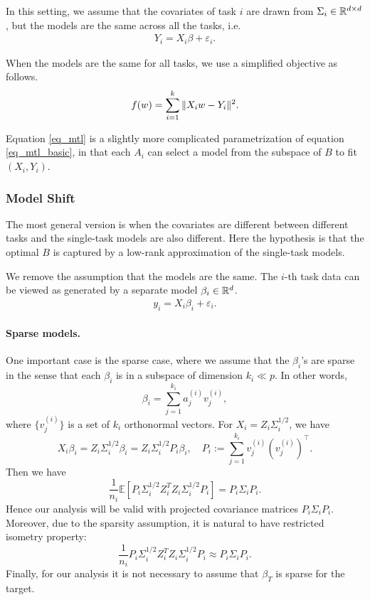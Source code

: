 In this setting, we assume that the covariates of task $i$ are drawn from $\Sigma_i \in \mathbb{R}^{d \times d}$, but the models are the same across all the tasks, i.e.
\begin{align}
	Y_i = X_i \beta + \varepsilon_i. %
\end{align}

When the models are the same for all tasks, we use a simplified objective as follows.
\begin{align}
	\label{eq_mtl_basic}
	f(w) = \sum_{i=1}^k \|X_i w - Y_i\|^2.
\end{align}

Equation \eqref{eq_mtl} is a slightly more complicated parametrization of equation \eqref{eq_mtl_basic}, in that each $A_i$ can select a model from the subspace of $B$ to fit $(X_i, Y_i)$.



\subsubsection{Model Shift}

The most general version is when the covariates are different between different tasks and the single-task models are also different.
Here the hypothesis is that the optimal $B$ is captured by a low-rank approximation of the single-task models.


We remove the assumption that the models are the same.
The $i$-th task data can be viewed as generated by a separate model $\beta_i\in\mathbb{R}^d$.
\begin{align}
	y_i = X_i \beta_i + \varepsilon_i.
\end{align}

\paragraph{Sparse models.}
One important case is the sparse case, where we assume that the $\beta_i$'s are sparse in the sense 
that each $\beta_i$ is in a subspace of dimension $k_i\ll p$. In other words,
$$\beta_i = \sum_{j=1}^{k_i} a^{(i)}_j v^{(i)}_j,$$
where $\{v^{(i)}_j\}$ is a set of $k_i$ orthonormal vectors. For $X_i= Z_i \Sigma_i^{1/2}$, we have 
$$ X_i \beta_i = Z_i \Sigma_i^{1/2}\beta_i=  Z_i \Sigma_i^{1/2}P_i\beta_i,\quad P_i:= \sum_{j=1}^{k_i}v_j^{(i)}(v_j^{(i)})^\top.$$
Then we have 
$$\frac{1}{n_i}\mathbb E\left[P_i \Sigma_i^{1/2} Z_i^T Z_i \Sigma_i^{1/2}P_i\right]=P_i \Sigma_i P_i.$$
Hence our analysis will be valid with projected covariance matrices $P_i \Sigma_i P_i$. Moreover, due to the sparsity assumption, it is natural to have restricted isometry property: 
$$\frac{1}{n_i} P_i \Sigma_i^{1/2} Z_i^T Z_i \Sigma_i^{1/2}P_i \approx P_i \Sigma_i P_i.$$
Finally, for our analysis it is not necessary to assume that $\beta_T$ is sparse for the target. 

